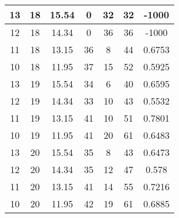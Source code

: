 \documentclass[letterpaper, 12pt]{article}
\begin{document}
\begin{longtable}{|c|c|c|c|c|c|c|}
\hline
13 & 18 & 15.54 & 0 & 32 & 32 & -1000 \\
\hline
12 & 18 & 14.34 & 0 & 36 & 36 & -1000 \\
\hline
11 & 18 & 13.15 & 36 & 8 & 44 & 0.6753 \\
\hline
10 & 18 & 11.95 & 37 & 15 & 52 & 0.5925 \\
\hline
13 & 19 & 15.54 & 34 & 6 & 40 & 0.6595 \\
\hline
12 & 19 & 14.34 & 33 & 10 & 43 & 0.5532 \\
\hline
11 & 19 & 13.15 & 41 & 10 & 51 & 0.7801 \\
\hline
10 & 19 & 11.95 & 41 & 20 & 61 & 0.6483 \\
\hline
13 & 20 & 15.54 & 35 & 8 & 43 & 0.6473 \\
\hline
12 & 20 & 14.34 & 35 & 12 & 47 & 0.578 \\
\hline
11 & 20 & 13.15 & 41 & 14 & 55 & 0.7216 \\
\hline
10 & 20 & 11.95 & 42 & 19 & 61 & 0.6885 \\
\hline
\end{longtable}
\end{document}
